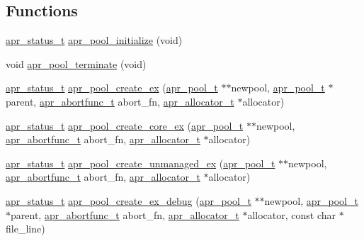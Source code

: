 \subsection*{Functions}
\begin{DoxyCompactItemize}
\item 
\hyperlink{group__apr__errno_gaf76ee4543247e9fb3f3546203e590a6c}{apr\-\_\-status\-\_\-t} \hyperlink{group__apr__pools_gad64a6a29515621bc13f8a8da50366d67}{apr\-\_\-pool\-\_\-initialize} (void)
\item 
void \hyperlink{group__apr__pools_ga3728aacec227318cef973b8a33f3b430}{apr\-\_\-pool\-\_\-terminate} (void)
\item 
\hyperlink{group__apr__errno_gaf76ee4543247e9fb3f3546203e590a6c}{apr\-\_\-status\-\_\-t} \hyperlink{group__apr__pools_gab274bd29e4e4d4944b4618403148074f}{apr\-\_\-pool\-\_\-create\-\_\-ex} (\hyperlink{group__apr__pools_gaf137f28edcf9a086cd6bc36c20d7cdfb}{apr\-\_\-pool\-\_\-t} $\ast$$\ast$newpool, \hyperlink{group__apr__pools_gaf137f28edcf9a086cd6bc36c20d7cdfb}{apr\-\_\-pool\-\_\-t} $\ast$parent, \hyperlink{group__apr__pools_ga0a1fe549a7c45b864c003ddf12115365}{apr\-\_\-abortfunc\-\_\-t} abort\-\_\-fn, \hyperlink{group__apr__allocator_ga1ceabfd30fcfc455e47d052d2a24244b}{apr\-\_\-allocator\-\_\-t} $\ast$allocator)
\item 
\hyperlink{group__apr__errno_gaf76ee4543247e9fb3f3546203e590a6c}{apr\-\_\-status\-\_\-t} \hyperlink{group__apr__pools_ga20e514c83555398acddc30c4dfa0c540}{apr\-\_\-pool\-\_\-create\-\_\-core\-\_\-ex} (\hyperlink{group__apr__pools_gaf137f28edcf9a086cd6bc36c20d7cdfb}{apr\-\_\-pool\-\_\-t} $\ast$$\ast$newpool, \hyperlink{group__apr__pools_ga0a1fe549a7c45b864c003ddf12115365}{apr\-\_\-abortfunc\-\_\-t} abort\-\_\-fn, \hyperlink{group__apr__allocator_ga1ceabfd30fcfc455e47d052d2a24244b}{apr\-\_\-allocator\-\_\-t} $\ast$allocator)
\item 
\hyperlink{group__apr__errno_gaf76ee4543247e9fb3f3546203e590a6c}{apr\-\_\-status\-\_\-t} \hyperlink{group__apr__pools_gaae7212db77bb57f86419cd594f73a92f}{apr\-\_\-pool\-\_\-create\-\_\-unmanaged\-\_\-ex} (\hyperlink{group__apr__pools_gaf137f28edcf9a086cd6bc36c20d7cdfb}{apr\-\_\-pool\-\_\-t} $\ast$$\ast$newpool, \hyperlink{group__apr__pools_ga0a1fe549a7c45b864c003ddf12115365}{apr\-\_\-abortfunc\-\_\-t} abort\-\_\-fn, \hyperlink{group__apr__allocator_ga1ceabfd30fcfc455e47d052d2a24244b}{apr\-\_\-allocator\-\_\-t} $\ast$allocator)
\item 
\hyperlink{group__apr__errno_gaf76ee4543247e9fb3f3546203e590a6c}{apr\-\_\-status\-\_\-t} \hyperlink{group__apr__pools_gacbea97ae5c0c861f6b7c147d46ac1d0c}{apr\-\_\-pool\-\_\-create\-\_\-ex\-\_\-debug} (\hyperlink{group__apr__pools_gaf137f28edcf9a086cd6bc36c20d7cdfb}{apr\-\_\-pool\-\_\-t} $\ast$$\ast$newpool, \hyperlink{group__apr__pools_gaf137f28edcf9a086cd6bc36c20d7cdfb}{apr\-\_\-pool\-\_\-t} $\ast$parent, \hyperlink{group__apr__pools_ga0a1fe549a7c45b864c003ddf12115365}{apr\-\_\-abortfunc\-\_\-t} abort\-\_\-fn, \hyperlink{group__apr__allocator_ga1ceabfd30fcfc455e47d052d2a24244b}{apr\-\_\-allocator\-\_\-t} $\ast$allocator, const char $\ast$file\-\_\-line)

\end{DoxyCompactItemize}
